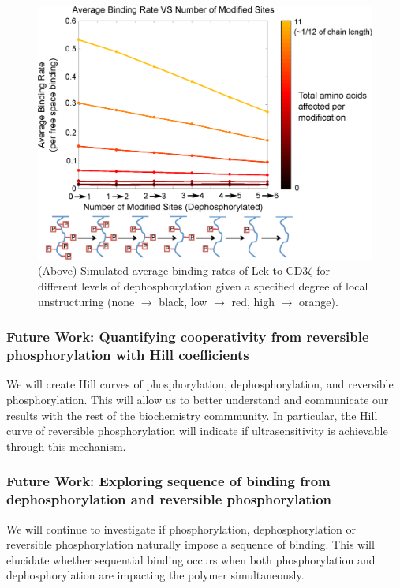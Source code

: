 \documentclass[../../AdvancementSummary.tex]{subfiles}
\begin{document}
\begin{figure}[H]
	\begin{center}
		\includegraphics[width=0.8\linewidth]{ResultsFigures/CD3ZetaStiffeningMembraneOn/Dephosphorylation/AvgBindVSTotalModified5.eps}
		\caption{(Above) Simulated average binding rates of Lck to CD3$\zeta$ for different levels of dephosphorylation given a specified degree of local unstructuring (none $\rightarrow$ black, low $\rightarrow$ red, high $\rightarrow$ orange).\label{fig: DephosMemOnCoop}}
	\end{center}
\end{figure}


\subsubsection{Future Work: Quantifying cooperativity from reversible phosphorylation with Hill coefficients}

We will create Hill curves of phosphorylation, dephosphorylation, and reversible phosphorylation.  This will allow us to better understand and communicate our results with the rest of the biochemistry commmunity. In particular, the Hill curve of reversible phosphorylation will indicate if ultrasensitivity is achievable through this mechanism. 

\subsubsection{Future Work: Exploring sequence of binding from dephosphorylation and reversible phosphorylation}

We will continue to investigate if phosphorylation, dephosphorylation or reversible phosphorylation naturally impose a sequence of binding. This will elucidate whether sequential binding occurs when both phosphorylation and dephosphorylation are impacting the polymer simultaneously. 
\end{document}
